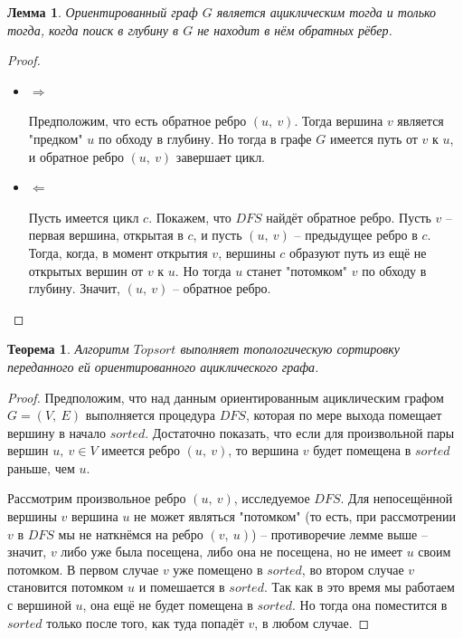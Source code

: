 \documentclass[a4paper,12pt]{article}
\newtheorem*{fulllemma}{Лемма}
\newtheorem*{theorem}{Теорема}
\begin{document}
\begin{fulllemma}
Ориентированный граф $G$ является ациклическим тогда и только тогда, когда поиск в глубину в $G$ не находит в нём обратных рёбер.
\end{fulllemma}
\begin{proof}
\begin{itemize}
    \item $\Longrightarrow$
    
    Предположим, что есть обратное ребро $(u,\ v)$. Тогда вершина $v$ является "предком" $u$ по обходу в глубину. Но тогда в графе $G$ имеется путь от $v$ к $u$, и обратное ребро $(u,\ v)$ завершает цикл.
    
    \item $\Longleftarrow$
    
    Пусть имеется цикл $c$. Покажем, что $DFS$ найдёт обратное ребро. Пусть $v$ -- первая вершина, открытая в $c$, и пусть $(u,\ v)$ -- предыдущее ребро в $c$. Тогда, когда, в момент открытия $v$, вершины $c$ образуют путь из ещё не открытых вершин от $v$ к $u$. Но тогда $u$ станет "потомком" $v$ по обходу в глубину. Значит, $(u,\ v)$ -- обратное ребро.
\end{itemize}
\end{proof}
\begin{theorem}
    Алгоритм $Topsort$ выполняет топологическую сортировку переданного ей ориентированного ациклического графа.
\end{theorem}
\begin{proof}
    Предположим, что над данным ориентированным ациклическим графом $G = (V,\ E)$ выполняется процедура $DFS$, которая по мере выхода помещает вершину в начало $sorted$. Достаточно показать, что если для произвольной пары вершин $u,\ v \in V$ имеется ребро $(u,\ v)$, то вершина $v$ будет помещена в $sorted$ раньше, чем $u$.
    
    Рассмотрим произвольное ребро $(u,\ v)$, исследуемое $DFS$. Для непосещённой вершины $v$ вершина $u$ не может являться "потомком" (то есть, при рассмотрении $v$ в $DFS$ мы не наткнёмся на ребро $(v,\ u)$) -- противоречие лемме выше -- значит, $v$ либо уже была посещена, либо она не посещена, но не имеет $u$ своим потомком. В первом случае $v$ уже помещено в $sorted$, во втором случае $v$ становится потомком $u$ и помешается в $sorted$. Так как в это время мы работаем с вершиной $u$, она ещё не будет помещена в $sorted$. Но тогда она поместится в $sorted$ только после того, как туда попадёт $v$, в любом случае.
\end{proof}
\end{document}
